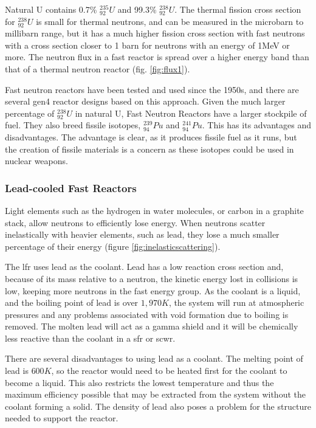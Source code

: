 Natural U contains 0.7\% ${}^{235}_{92}U$ and 99.3\% ${}^{238}_{92}U$\cite{uraniumenrichment}.  The thermal fission cross section for ${}^{238}_{92}U$ is small for thermal neutrons, and can be measured in the microbarn to millibarn range, but it has a much higher fission cross section with fast neutrons with a cross section closer to 1 barn for neutrons with an energy of 1MeV or more.  The neutron flux in a fast reactor is spread over a higher energy band than that of a thermal neutron reactor (fig. \ref{fig:flux1}).

Fast neutron reactors have been tested and used since the 1950s, and there are several \acrshort{gen4} reactor designs based on this approach.  Given the much larger percentage of ${}^{238}_{92}U$ in natural U, Fast Neutron Reactors have a larger stockpile of fuel.  They also breed fissile isotopes, ${}^{239}_{94}Pu$ and ${}^{241}_{94}Pu$.  This has its advantages and disadvantages.  The advantage is clear, as it produces fissile fuel as it runs, but the creation of fissile materials is a concern as these isotopes could be used in nuclear weapons.

\subsubsection{Lead-cooled Fast Reactors}

Light elements such as the hydrogen in water molecules, or carbon in a graphite stack, allow neutrons to efficiently lose energy.  When neutrons scatter inelastically with heavier elements, such as lead, they lose a much smaller percentage of their energy (figure \ref{fig:inelasticscattering}).

The \acrfull{lfr} uses lead as the coolant.  Lead has a low reaction cross section and, because of its mass relative to a neutron, the kinetic energy lost in collisions is low, keeping more neutrons in the fast energy group.  As the coolant is a liquid, and the boiling point of lead is over $1,970K$, the system will run at atmospheric pressures and any problems associated with void formation due to boiling is removed.  The molten lead will act as a gamma shield and it will be chemically less reactive than the coolant in a \acrfull{sfr} or \acrfull{scwr}.

There are several disadvantages to using lead as a coolant.  The melting point of lead is $600K$, so the reactor would need to be heated first for the coolant to become a liquid.  This also restricts the lowest temperature and thus the maximum efficiency possible that may be extracted from the system without the coolant forming a solid.  The density of lead also poses a problem for the structure needed to support the reactor.

